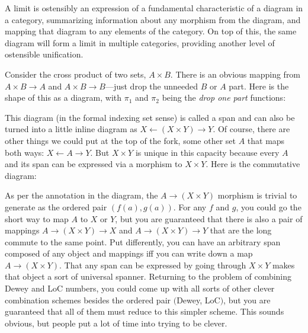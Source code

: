 \documentclass[11pt]{article}
\begin{document}
A limit is ostensibly an expression of a fundamental characteristic of a diagram in a
category, summarizing information about any morphism from the diagram, and mapping that
diagram to any elements of the category. On top of this, the same diagram will form a
limit in multiple categories, providing another level of ostensible unification.

Consider the cross product of two sets, $A\times B$. There is an obvious mapping from
$A\times B \to A$ and $A\times B \to B$---just drop the unneeded $B$ or $A$ part. Here
is the shape of this as a diagram, with $\pi_1$ and $\pi_2$ being the {\em drop one
part} functions:


This diagram (in the formal indexing set sense) is called a span and can also be turned into a little inline diagram as
$X \leftarrow (X\times Y) \rightarrow Y$.
Of course, there are other things we could put at the top of the fork, some other
set $A$ that maps both ways: $X \leftarrow A \rightarrow Y$.
But $X\times Y$ is unique in this capacity because every $A$ and its span can be expressed
via a morphism to $X\times Y$. Here is the commutative diagram:


As per the annotation in the diagram, the $A\to (X\times Y)$ morphism is trivial to generate as
the ordered pair $(f(a), g(a))$.  For any $f$ and $g$, you could go the short way to
map $A$ to $X$ or $Y$, but you are guaranteed that there is also a pair of mappings
$A\to (X\times Y) \to X$ and $A\to (X\times Y) \to Y$ that are the long commute to the
same point.  Put differently, you can have an arbitrary span composed of any object and
mappings iff you can write down a map $A\to (X\times Y)$. That any span can be expressed
by going through $X\times Y$ makes that object a sort of universal spanner. Returning
to the problem of combining Dewey and LoC numbers, you could come up with all sorts
of other clever combination schemes besides the ordered pair $($Dewey, LoC$)$, but
you are guaranteed that all of them must reduce to this simpler scheme. This sounds
obvious, but people put a lot of time into trying to be clever.
\end{document}
